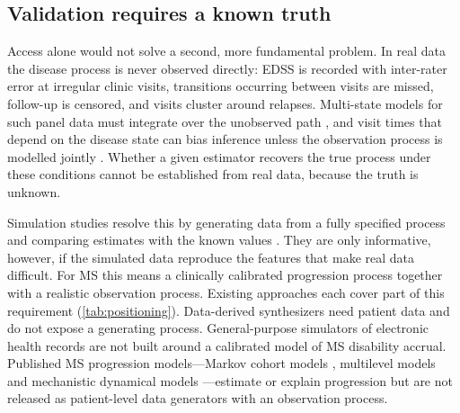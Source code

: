 \documentclass[11pt,a4paper]{article}
\begin{document}
\subsection*{Validation requires a known truth}

Access alone would not solve a second, more fundamental problem. In real data the disease process is never observed directly: EDSS is recorded with inter-rater error at irregular clinic visits, transitions occurring between visits are missed, follow-up is censored, and visits cluster around relapses. Multi-state models for such panel data must integrate over the unobserved path \cite{kalbfleisch1985,jackson2011,mandel2007}, and visit times that depend on the disease state can bias inference unless the observation process is modelled jointly \cite{lange2015}. Whether a given estimator recovers the true process under these conditions cannot be established from real data, because the truth is unknown.

Simulation studies resolve this by generating data from a fully specified process and comparing estimates with the known values \cite{burton2006,morris2019}. They are only informative, however, if the simulated data reproduce the features that make real data difficult. For MS this means a clinically calibrated progression process together with a realistic observation process. Existing approaches each cover part of this requirement (\cref{tab:positioning}). Data-derived synthesizers \cite{nowok2016} need patient data and do not expose a generating process. General-purpose simulators of electronic health records \cite{walonoski2018} are not built around a calibrated model of MS disability accrual. Published MS progression models---Markov cohort models \cite{palace2014}, multilevel models \cite{tilling2016} and mechanistic dynamical models \cite{kannan2017}---estimate or explain progression but are not released as patient-level data generators with an observation process.
\end{document}
